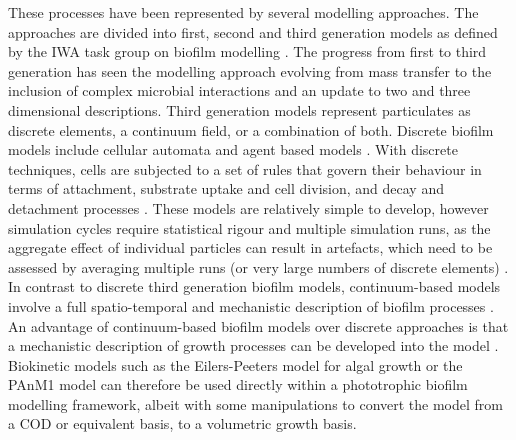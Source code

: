 These processes have been represented by several modelling approaches. The approaches are divided into first, second and third generation models as defined by the IWA task group on biofilm modelling \cite{wanner2006}. The progress from first to third generation has seen the modelling approach evolving from mass transfer to the inclusion of complex microbial interactions and an update to two and three dimensional descriptions. Third generation models represent particulates as discrete elements, a continuum field, or a combination of both. Discrete biofilm models include cellular automata and agent based models \cite{skoneczny2015}. With discrete techniques, cells are subjected to a set of rules that govern their behaviour in terms of attachment, substrate uptake and cell division, and decay and detachment processes \cite{skoneczny2015}. These models are relatively simple to develop, however simulation cycles require statistical rigour and multiple simulation runs, as the aggregate effect of individual particles can result in artefacts, which need to be assessed by averaging multiple runs (or very large numbers of discrete elements) \cite{dacunto2017}. In contrast to discrete third generation biofilm models, continuum-based models involve a full spatio-temporal and mechanistic description of biofilm processes \cite{eberl2001}. An advantage of continuum-based biofilm models over discrete approaches is that a mechanistic description of growth processes can be developed into the model . Biokinetic models such as the Eilers-Peeters model for algal growth \cite{eilers1988} or the PAnM1 model \cite{puyol2017} can therefore be used directly within a phototrophic biofilm modelling framework, albeit with some manipulations to convert the model from a COD or equivalent basis, to a volumetric growth basis. 
\skippingparagraph
